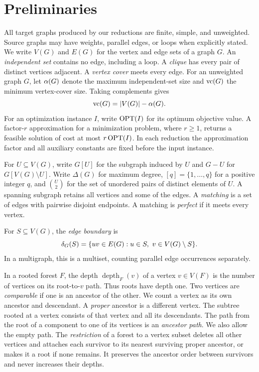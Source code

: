 \section{Preliminaries}
\label{sec:preliminaries}

All target graphs produced by our reductions are finite, simple, and
unweighted. Source graphs may have weights, parallel edges, or loops
when explicitly stated. We write $V(G)$ and $E(G)$ for the vertex and
edge sets of a graph $G$. An \emph{independent set} contains no edge,
including a loop. A \emph{clique} has every pair of distinct vertices adjacent.
A \emph{vertex cover} meets every edge. For an unweighted graph $G$,
let $\alpha(G)$ denote the maximum independent-set size and
$\operatorname{vc}(G)$ the minimum vertex-cover size.
Taking complements gives
\begin{equation}\label{eq:cover-independent-complement}
 \operatorname{vc}(G)=|V(G)|-\alpha(G).
\end{equation}
For an optimization instance $I$, write $\operatorname{OPT}(I)$ for its optimum
objective value.
A factor-$r$ approximation for a minimization problem, where $r\ge1$,
returns a feasible solution of cost at most $r\operatorname{OPT}(I)$.
In each reduction the approximation factor and all auxiliary constants
are fixed before the input instance.

For $U\subseteq V(G)$, write $G[U]$ for the subgraph induced by $U$
and $G-U$ for $G[V(G)\setminus U]$. Write $\Delta(G)$ for maximum
degree, $[q]=\{1,\ldots,q\}$ for a positive integer $q$, and
$\binom{U}{2}$ for the set of unordered pairs of distinct elements of $U$.
A spanning subgraph retains all vertices
and some of the edges. A \emph{matching} is a set of edges with
pairwise disjoint endpoints. A matching is \emph{perfect} if it meets
every vertex.

For $S\subseteq V(G)$, the \emph{edge boundary} is
\[
 \delta_G(S)=\{uv\in E(G):u\in S,\ v\in V(G)\setminus S\}.
\]
In a multigraph, this is a multiset, counting parallel edge
occurrences separately.

In a rooted forest $F$, the depth $\operatorname{depth}_F(v)$ of a
vertex $v\in V(F)$ is the number of vertices on its root-to-$v$ path.
Thus roots have depth one. Two vertices are \emph{comparable} if one is
an ancestor of the other. We count a vertex as its own ancestor
and descendant. A \emph{proper} ancestor is a different vertex.
The subtree rooted at a vertex consists of that vertex and all
its descendants. The path from the root of a component to one of its
vertices is an \emph{ancestor path}. We also allow the empty path.
The \emph{restriction} of a forest to a vertex subset deletes all
other vertices and attaches each survivor to its nearest surviving
proper ancestor, or makes it a root if none remains. It preserves
the ancestor order between survivors and never increases their depths.

